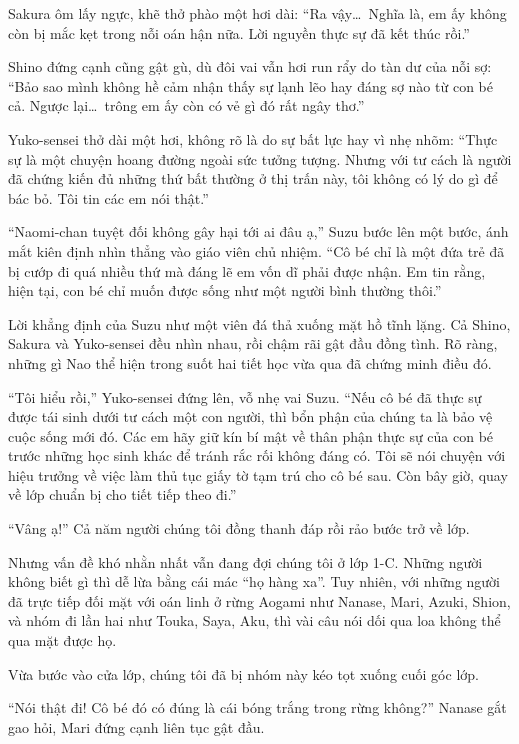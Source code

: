 \documentclass[../main.tex]{subfiles}
\begin{document}
Sakura ôm lấy ngực, khẽ thở phào một hơi dài: ``Ra vậy\dots\ Nghĩa là, em ấy không còn bị mắc kẹt trong nỗi oán hận nữa. Lời nguyền thực sự đã kết thúc rồi.''

Shino đứng cạnh cũng gật gù, dù đôi vai vẫn hơi run rẩy do tàn dư của nỗi sợ: ``Bảo sao mình không hề cảm nhận thấy sự lạnh lẽo hay đáng sợ nào từ con bé cả. Ngược lại\dots\ trông em ấy còn có vẻ gì đó rất ngây thơ.''

Yuko-sensei thở dài một hơi, không rõ là do sự bất lực hay vì nhẹ nhõm: ``Thực sự là một chuyện hoang đường ngoài sức tưởng tượng. Nhưng với tư cách là người đã chứng kiến đủ những thứ bất thường ở thị trấn này, tôi không có lý do gì để bác bỏ. Tôi tin các em nói thật.''

``Naomi-chan tuyệt đối không gây hại tới ai đâu ạ,'' Suzu bước lên một bước, ánh mắt kiên định nhìn thẳng vào giáo viên chủ nhiệm. ``Cô bé chỉ là một đứa trẻ đã bị cướp đi quá nhiều thứ mà đáng lẽ em vốn dĩ phải được nhận. Em tin rằng, hiện tại, con bé chỉ muốn được sống như một người bình thường thôi.''

Lời khẳng định của Suzu như một viên đá thả xuống mặt hồ tĩnh lặng. Cả Shino, Sakura và Yuko-sensei đều nhìn nhau, rồi chậm rãi gật đầu đồng tình. Rõ ràng, những gì Nao thể hiện trong suốt hai tiết học vừa qua đã chứng minh điều đó.

``Tôi hiểu rồi,'' Yuko-sensei đứng lên, vỗ nhẹ vai Suzu. ``Nếu cô bé đã thực sự được tái sinh dưới tư cách một con người, thì bổn phận của chúng ta là bảo vệ cuộc sống mới đó. Các em hãy giữ kín bí mật về thân phận thực sự của con bé trước những học sinh khác để tránh rắc rối không đáng có. Tôi sẽ nói chuyện với hiệu trưởng về việc làm thủ tục giấy tờ tạm trú cho cô bé sau. Còn bây giờ, quay về lớp chuẩn bị cho tiết tiếp theo đi.''

``Vâng ạ!'' Cả năm người chúng tôi đồng thanh đáp rồi rảo bước trở về lớp.

Nhưng vấn đề khó nhằn nhất vẫn đang đợi chúng tôi ở lớp 1-C. Những người không biết gì thì dễ lừa bằng cái mác ``họ hàng xa''. Tuy nhiên, với những người đã trực tiếp đối mặt với oán linh ở rừng Aogami như Nanase, Mari, Azuki, Shion, và nhóm đi lần hai như Touka, Saya, Aku, thì vài câu nói dối qua loa không thể qua mặt được họ.

Vừa bước vào cửa lớp, chúng tôi đã bị nhóm này kéo tọt xuống cuối góc lớp.

``Nói thật đi! Cô bé đó có đúng là cái bóng trắng trong rừng không?'' Nanase gắt gao hỏi, Mari đứng cạnh liên tục gật đầu.
\end{document}
